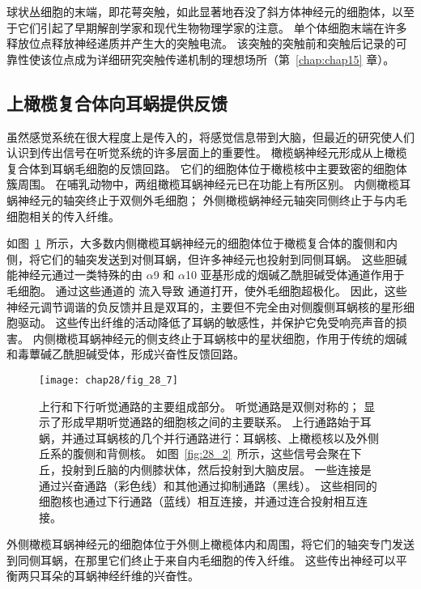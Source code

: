 球状丛细胞的末端，即花萼突触，如此显著地吞没了斜方体神经元的细胞体，以至于它们引起了早期解剖学家和现代生物物理学家的注意。
单个体细胞末端在许多释放位点释放神经递质并产生大的突触电流。
该突触的突触前和突触后记录的可靠性使该位点成为详细研究突触传递机制的理想场所（第~\ref{chap:chap15} 章）。



\subsection{上橄榄复合体向耳蜗提供反馈}

虽然感觉系统在很大程度上是传入的，将感觉信息带到大脑，但最近的研究使人们认识到传出信号在听觉系统的许多层面上的重要性。
橄榄蜗神经元形成从上橄榄复合体到耳蜗毛细胞的反馈回路。
它们的细胞体位于橄榄核中主要致密的细胞体簇周围。
在哺乳动物中，两组橄榄耳蜗神经元已在功能上有所区别。
内侧橄榄耳蜗神经元的轴突终止于双侧外毛细胞；
外侧橄榄蜗神经元轴突同侧终止于与内毛细胞相关的传入纤维。


如图~\ref{fig:28_7}~所示，大多数内侧橄榄耳蜗神经元的细胞体位于橄榄复合体的腹侧和内侧，将它们的轴突发送到对侧耳蜗，但许多神经元也投射到同侧耳蜗。
这些胆碱能神经元通过一类特殊的由 $\alpha$9 和 $\alpha$10 亚基形成的烟碱乙酰胆碱受体通道作用于毛细胞。
通过这些通道的  流入导致  通道打开，使外毛细胞超极化。
因此，这些神经元调节调谐的负反馈并且是双耳的，主要但不完全由对侧腹侧耳蜗核的星形细胞驱动。
这些传出纤维的活动降低了耳蜗的敏感性，并保护它免受响亮声音的损害。
内侧橄榄耳蜗神经元的侧支终止于耳蜗核中的星状细胞，作用于传统的烟碱和毒蕈碱乙酰胆碱受体，形成兴奋性反馈回路。


\begin{figure}[htbp]
	\centering
	\texttt{[image: chap28/fig\_28\_7]}
	\caption{上行和下行听觉通路的主要组成部分。
		听觉通路是双侧对称的；
		显示了形成早期听觉通路的细胞核之间的主要联系。
		上行通路始于耳蜗，并通过耳蜗核的几个并行通路进行：耳蜗核、上橄榄核以及外侧丘系的腹侧和背侧核。
		如图~\ref{fig:28_2}~所示，这些信号会聚在下丘，投射到丘脑的内侧膝状体，然后投射到大脑皮层。
		一些连接是通过兴奋通路（彩色线）和其他通过抑制通路（黑线）。 
		这些相同的细胞核也通过下行通路（蓝线）相互连接，并通过连合投射相互连接。}
	\label{fig:28_7}
\end{figure}


外侧橄榄耳蜗神经元的细胞体位于外侧上橄榄体内和周围，将它们的轴突专门发送到同侧耳蜗，在那里它们终止于来自内毛细胞的传入纤维。
这些传出神经可以平衡两只耳朵的耳蜗神经纤维的兴奋性\cite{darrow2006cochlear}。



